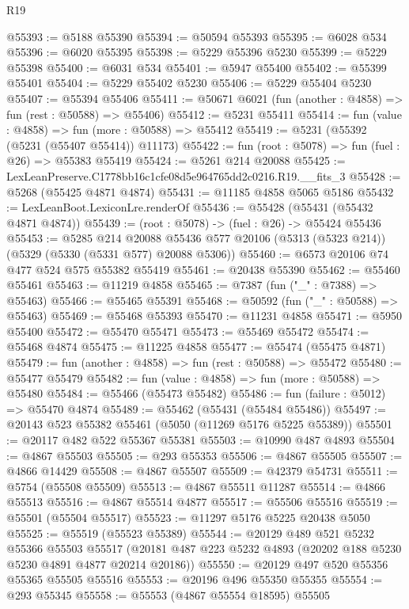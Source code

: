 \begin{lexlean}{R19}
\begin{coremodule}
@55393 := @5188 @55390
@55394 := @50594 @55393
@55395 := @6028 @534
@55396 := @6020 @55395
@55398 := @5229 @55396 @5230
@55399 := @5229 @55398
@55400 := @6031 @534
@55401 := @5947 @55400
@55402 := @55399 @55401
@55404 := @5229 @55402 @5230
@55406 := @5229 @55404 @5230
@55407 := @55394 @55406
@55411 := @50671 @6021 (fun (another : @4858) => fun (rest : @50588) => @55406)
@55412 := @5231 @55411
@55414 := fun (value : @4858) => fun (more : @50588) => @55412
@55419 := @5231 (@55392 (@5231 (@55407 @55414)) @11173)
@55422 := fun (root : @5078) => fun (fuel : @26) => @55383 @55419
@55424 := @5261 @214 @20088
@55425 := LexLeanPreserve.C1778bb16c1cfe08d5e964765dd2c0216.R19.__fits_3
@55428 := @5268 (@55425 @4871 @4874)
@55431 := @11185 @4858 @5065 @5186
@55432 := LexLeanBoot.LexiconLre.renderOf
@55436 := @55428 (@55431 (@55432 @4871 @4874))
@55439 := (root : @5078) -> (fuel : @26) -> @55424 @55436
@55453 := @5285
    @214
    @20088
    @55436
    @577
    @20106
    (@5313 (@5323 @214))
    (@5329 (@5330 (@5331 @577) @20088 @5306))
@55460 := @6573 @20106 @74 @477 @524 @575 @55382 @55419
@55461 := @20438 @55390
@55462 := @55460 @55461
@55463 := @11219 @4858
@55465 := @7387 (fun ("_" : @7388) => @55463)
@55466 := @55465 @55391
@55468 := @50592 (fun ("_" : @50588) => @55463)
@55469 := @55468 @55393
@55470 := @11231 @4858
@55471 := @5950 @55400
@55472 := @55470 @55471
@55473 := @55469 @55472
@55474 := @55468 @4874
@55475 := @11225 @4858
@55477 := @55474 (@55475 @4871)
@55479 := fun (another : @4858) => fun (rest : @50588) => @55472
@55480 := @55477 @55479
@55482 := fun (value : @4858) => fun (more : @50588) => @55480
@55484 := @55466 (@55473 @55482)
@55486 := fun (failure : @5012) => @55470 @4874
@55489 := @55462 (@55431 (@55484 @55486))
@55497 := @20143 @523 @55382 @55461 (@5050 (@11269 @5176 @5225 @55389))
@55501 := @20117 @482 @522 @55367 @55381
@55503 := @10990 @487 @4893
@55504 := @4867 @55503
@55505 := @293 @55353
@55506 := @4867 @55505
@55507 := @4866 @14429
@55508 := @4867 @55507
@55509 := @42379 @54731
@55511 := @5754 (@55508 @55509)
@55513 := @4867 @55511 @11287
@55514 := @4866 @55513
@55516 := @4867 @55514 @4877
@55517 := @55506 @55516
@55519 := @55501 (@55504 @55517)
@55523 := @11297 @5176 @5225 @20438 @5050
@55525 := @55519 (@55523 @55389)
@55544 := @20129
    @489
    @521
    @5232
    @55366
    @55503
    @55517
    (@20181 @487 @223 @5232 @4893 (@20202 @188 @5230 @5230 @4891 @4877 @20214 @20186))
@55550 := @20129 @497 @520 @55356 @55365 @55505 @55516
@55553 := @20196 @496 @55350 @55355
@55554 := @293 @55345
@55558 := @55553 (@4867 @55554 @18595) @55505

\end{coremodule}
\end{lexlean}
